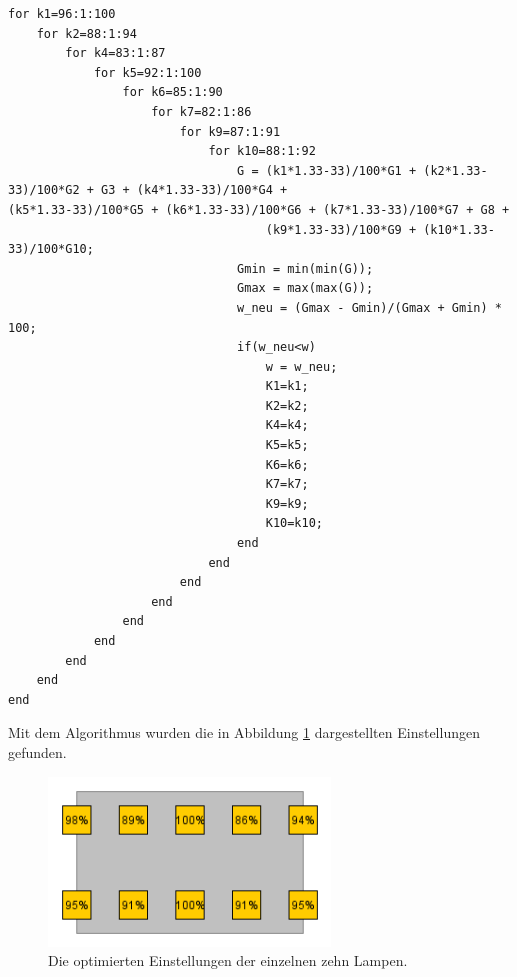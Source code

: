 \documentclass[a4paper,bibtotoc,oneside]{scrbook}
\begin{document}
\begin{verbatim}
for k1=96:1:100
    for k2=88:1:94
        for k4=83:1:87
            for k5=92:1:100
                for k6=85:1:90
                    for k7=82:1:86
                        for k9=87:1:91
                            for k10=88:1:92
                                G = (k1*1.33-33)/100*G1 + (k2*1.33-33)/100*G2 + G3 + (k4*1.33-33)/100*G4 + 		                                    (k5*1.33-33)/100*G5 + (k6*1.33-33)/100*G6 + (k7*1.33-33)/100*G7 + G8 +  
                                    (k9*1.33-33)/100*G9 + (k10*1.33-33)/100*G10;
                                Gmin = min(min(G));
                                Gmax = max(max(G));
                                w_neu = (Gmax - Gmin)/(Gmax + Gmin) * 100;
                                if(w_neu<w)
                                    w = w_neu;
                                    K1=k1;
                                    K2=k2;
                                    K4=k4;
                                    K5=k5;
                                    K6=k6;
                                    K7=k7;
                                    K9=k9;
                                    K10=k10;                                  
                                end
                            end
                        end
                    end
                end
            end
        end
    end
end
\end{verbatim}

Mit dem Algorithmus wurden die in Abbildung \ref{opt} dargestellten Einstellungen gefunden.

\begin{figure}[htbp]
\centering
\includegraphics[width=75mm]{img/std.png}
\caption{Die optimierten Einstellungen der einzelnen zehn Lampen.}\label{opt}
\end{figure}
\end{document}
